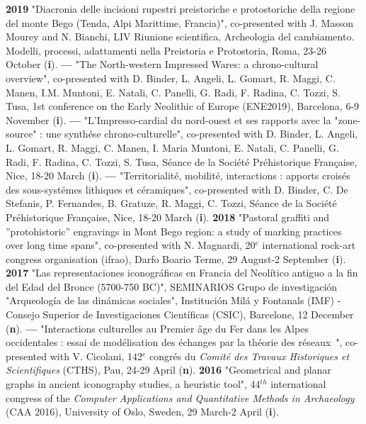 \documentclass{article}
\begin{document}
\smallbreak
\textbf{2019 }"Diacronia delle incisioni rupestri preistoriche e protostoriche della regione del monte Bego (Tenda, Alpi Marittime, Francia)", co-presented with J. Masson Mourey and N. Bianchi, LIV Riunione scientifica, Archeologia del cambiamento. Modelli, processi, adattamenti nella Preistoria e Protostoria, Roma, 23-26 October (\textbf{i}).
\smallbreak
\textbf{--- }"The North-western Impressed Wares: a chrono-cultural overview", co-presented with D. Binder, L. Angeli, L. Gomart, R. Maggi, C. Manen, I.M. Muntoni, E. Natali, C. Panelli, G. Radi, F. Radina, C. Tozzi, S. Tusa, 1st conference on the Early Neolithic of Europe (ENE2019), Barcelona, 6-9 November (\textbf{i}).
\smallbreak
\textbf{--- }"L'Impresso-cardial du nord-ouest et ses rapports avec la "zone-source" : une synth\'{e}se chrono-culturelle", co-presented with D. Binder, L. Angeli, L. Gomart, R. Maggi, C. Manen, I. Maria Muntoni, E. Natali, C. Panelli, G. Radi, F. Radina, C. Tozzi, S. Tusa, S\'{e}ance de la Soci\'{e}t\'{e} Pr\'{e}historique Fran\c{c}aise, Nice, 18-20 March (\textbf{i}).
\smallbreak
\textbf{--- }"Territorialit\'{e}, mobilit\'{e}, interactions : apports crois\'{e}s des sous-syst\'{e}mes lithiques et c\'{e}ramiques", co-presented with D. Binder, C. De Stefanis, P. Fernandes, B. Gratuze, R. Maggi, C. Tozzi, S\'{e}ance de la Soci\'{e}t\'{e} Pr\'{e}historique Fran\c{c}aise, Nice, 18-20 March (\textbf{i}).
\smallbreak
\textbf{2018 }"Pastoral graffiti and ''protohistoric'' engravings in Mont Bego region: a study of marking practices over long time spans", co-presented with N. Magnardi, 20${}^{e}$ international rock-art congress organisation (ifrao), Darfo Boario Terme, 29 August-2 September (\textbf{i}).
\smallbreak
\textbf{2017 }"Las representaciones iconogr\'{a}ficas en Francia del Neol\'{i}tico antiguo a la fin del Edad del Bronce (5700-750 BC)", SEMINARIOS Grupo de investigaci\'{o}n "Arqueolog\'{i}a de las din\'{a}micas sociales", Instituci\'{o}n Mil\'{a} y Fontanals (IMF) - Consejo Superior de Investigaciones Cient\'{i}ficas (CSIC), Barcelone, 12 December (\textbf{n}).
\smallbreak
\textbf{--- } "Interactions culturelles au Premier \^{a}ge du Fer dans les Alpes occidentales : essai de mod\'{e}lisation des \'{e}changes par la th\'{e}orie des r\'{e}seaux~", co-presented with V. Cicolani, 142${}^{e}$ congr\'{e}s du \textit{Comit\'{e} des Travaux Historiques et Scientifiques} (CTHS), Pau, 24-29 April (\textbf{n}).
\smallbreak
\textbf{2016 }"Geometrical and planar graphs in ancient iconography studies, a heuristic tool", 44${}^{th}$ international congress of the \textit{Computer Applications and Quantitative Methods in Archaeology} (CAA 2016), University of Oslo, Sweden, 29 March-2 April (\textbf{i}).
\end{document}
